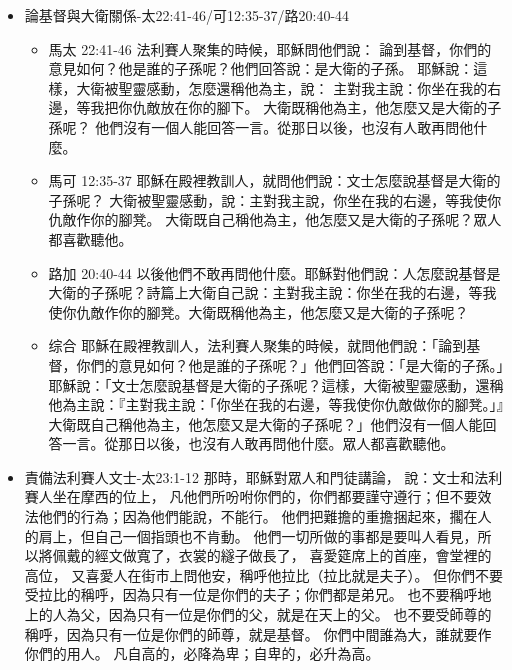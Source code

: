 \begin{itemize}
\item{論基督與大衛關係-太22:41-46/可12:35-37/路20:40-44}
\begin{itemize}
\item{馬太 22:41-46}
法利賽人聚集的時候，耶穌問他們說：
論到基督，你們的意見如何？他是誰的子孫呢？他們回答說：是大衛的子孫。
耶穌說：這樣，大衛被聖靈感動，怎麼還稱他為主，說：
主對我主說：你坐在我的右邊，等我把你仇敵放在你的腳下。
大衛既稱他為主，他怎麼又是大衛的子孫呢？
他們沒有一個人能回答一言。從那日以後，也沒有人敢再問他什麼。
\item{馬可 12:35-37}
耶穌在殿裡教訓人，就問他們說：文士怎麼說基督是大衛的子孫呢？
大衛被聖靈感動，說：主對我主說，你坐在我的右邊，等我使你仇敵作你的腳凳。
大衛既自己稱他為主，他怎麼又是大衛的子孫呢？眾人都喜歡聽他。
\item{路加 20:40-44}
以後他們不敢再問他什麼。耶穌對他們說：人怎麼說基督是大衛的子孫呢？詩篇上大衛自己說：主對我主說：你坐在我的右邊，等我使你仇敵作你的腳凳。大衛既稱他為主，他怎麼又是大衛的子孫呢？
\item{综合}
耶穌在殿裡教訓人，法利賽人聚集的時候，就問他們說：「論到基督，你們的意見如何？他是誰的子孫呢？」他們回答說：「是大衛的子孫。」耶穌說：「文士怎麼說基督是大衛的子孫呢？這樣，大衛被聖靈感動，還稱他為主說：『主對我主說：「你坐在我的右邊，等我使你仇敵做你的腳凳。」』大衛既自己稱他為主，他怎麼又是大衛的子孫呢？」他們沒有一個人能回答一言。從那日以後，也沒有人敢再問他什麼。眾人都喜歡聽他。
\end{itemize}
\item{責備法利賽人文士-太23:1-12}
那時，耶穌對眾人和門徒講論，
說：文士和法利賽人坐在摩西的位上，
凡他們所吩咐你們的，你們都要謹守遵行；但不要效法他們的行為；因為他們能說，不能行。
他們把難擔的重擔捆起來，擱在人的肩上，但自己一個指頭也不肯動。
他們一切所做的事都是要叫人看見，所以將佩戴的經文做寬了，衣裳的繸子做長了，
喜愛筵席上的首座，會堂裡的高位，
又喜愛人在街市上問他安，稱呼他拉比（拉比就是夫子）。
但你們不要受拉比的稱呼，因為只有一位是你們的夫子；你們都是弟兄。
也不要稱呼地上的人為父，因為只有一位是你們的父，就是在天上的父。
也不要受師尊的稱呼，因為只有一位是你們的師尊，就是基督。
你們中間誰為大，誰就要作你們的用人。
凡自高的，必降為卑；自卑的，必升為高。


\end{itemize}
